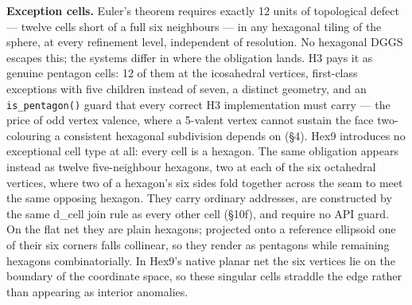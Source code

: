 \documentclass[
  11pt,
  a4paper,
]{article}
\begin{document}
\textbf{Exception cells.} Euler's theorem requires exactly 12 units of
topological defect --- twelve cells short of a full six neighbours ---
in any hexagonal tiling of the sphere, at every refinement level,
independent of resolution. No hexagonal DGGS escapes this; the systems
differ in where the obligation lands. H3 pays it as genuine pentagon
cells: 12 of them at the icosahedral vertices, first-class exceptions
with five children instead of seven, a distinct geometry, and an
\texttt{is\_pentagon()} guard that every correct H3 implementation must
carry --- the price of odd vertex valence, where a 5-valent vertex
cannot sustain the face two-colouring a consistent hexagonal subdivision
depends on (§4). Hex9 introduces no exceptional cell type at all: every
cell is a hexagon. The same obligation appears instead as twelve
five-neighbour hexagons, two at each of the six octahedral vertices,
where two of a hexagon's six sides fold together across the seam to meet
the same opposing hexagon. They carry ordinary addresses, are
constructed by the same d\_cell join rule as every other cell (§10f),
and require no API guard. On the flat net they are plain hexagons;
projected onto a reference ellipsoid one of their six corners falls
collinear, so they render as pentagons while remaining hexagons
combinatorially. In Hex9's native planar net the six vertices lie on the
boundary of the coordinate space, so these singular cells straddle the
edge rather than appearing as interior anomalies.
\end{document}
